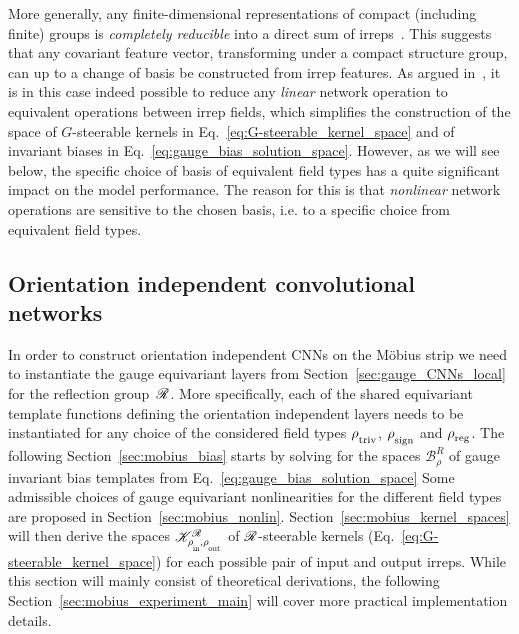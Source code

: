 More generally, any finite-dimensional representations of compact (including finite) groups is \emph{completely reducible} into a direct sum of irreps~\cite{gallier2019harmonicRepr,din2017reprLectureNotes,serre1977linear}.
This suggests that any covariant feature vector, transforming under a compact structure group, can up to a change of basis be constructed from irrep features.
As argued in~\cite{Weiler2019_E2CNN}, it is in this case indeed possible to reduce any \emph{linear} network operation to equivalent operations between irrep fields, which simplifies the construction of the space of $G$-steerable kernels in Eq.~\eqref{eq:G-steerable_kernel_space} and of invariant biases in Eq.~\eqref{eq:gauge_bias_solution_space}.
However, as we will see below, the specific choice of basis of equivalent field types has a quite significant impact on the model performance.
The reason for this is that \emph{nonlinear} network operations are sensitive to the chosen basis, i.e. to a specific choice from equivalent field types.













\subsection{Orientation independent convolutional networks}
\label{sec:mobius_cnn_ops_analytical}

In order to construct orientation independent CNNs on the M\"obius strip we need to instantiate the gauge equivariant layers from Section~\ref{sec:gauge_CNNs_local} for the reflection group~$\mathscr{R}$.
More specifically, each of the shared equivariant template functions defining the orientation independent layers needs to be instantiated for any choice of the considered field types $\rho_{\overset{}{\textup{triv}}}$, $\rho_{\overset{}{\textup{sign}}}$ and $\rho_{\overset{}{\textup{reg}}}$.
The following Section~\ref{sec:mobius_bias} starts by solving for the spaces $\mathscr{B}^R_\rho$ of gauge invariant bias templates from Eq.~\eqref{eq:gauge_bias_solution_space}
Some admissible choices of gauge equivariant nonlinearities for the different field types are proposed in Section~\ref{sec:mobius_nonlin}.
Section~\ref{sec:mobius_kernel_spaces} will then derive the spaces $\KR$ of $\mathscr{R}$-steerable kernels (Eq.~\eqref{eq:G-steerable_kernel_space}) for each possible pair of input and output irreps.
While this section will mainly consist of theoretical derivations, the following Section~\ref{sec:mobius_experiment_main} will cover more practical implementation details.




